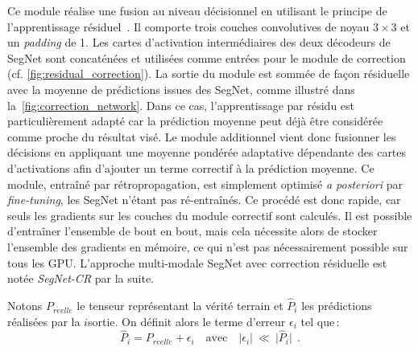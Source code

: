 Ce module réalise une fusion au niveau décisionnel en utilisant le principe de l'apprentissage résiduel~\cite{he_deep_2016}. Il comporte trois couches convolutives de noyau $3\times3$ et un \emph{padding} de \SI{1}{\px}. Les cartes d'activation intermédiaires des deux décodeurs de SegNet sont concaténées et utilisées comme entrées pour le module de correction (cf. \cref{fig:residual_correction}). La sortie du module est sommée de façon résiduelle avec la moyenne de prédictions issues des SegNet, comme illustré dans la~\cref{fig:correction_network}. Dans ce cas, l'apprentissage par résidu est particulièrement adapté car la prédiction moyenne peut déjà être considérée comme proche du résultat visé. Le module additionnel vient donc fusionner les décisions en appliquant une moyenne pondérée adaptative dépendante des cartes d'activations afin d'ajouter un terme correctif à la prédiction moyenne. Ce module, entraîné par rétropropagation, est simplement optimisé \emph{a posteriori} par \emph{fine-tuning}, les SegNet n'étant pas ré-entraînés. Ce procédé est donc rapide, car seuls les gradients sur les couches du module correctif sont calculés. Il est possible d'entraîner l'ensemble de bout en bout, mais cela nécessite alors de stocker l'ensemble des gradients en mémoire, ce qui n'est pas nécessairement possible sur tous les \gls{GPU}. L'approche multi-modale SegNet avec correction résiduelle est notée \emph{SegNet-CR} par la suite.



Notons $P_\mathit{r\acute{e}elle}$ le tenseur représentant la vérité terrain et $\hat{P}_i$ les prédictions réalisées par la $i$\ieme sortie. On définit alors le terme d'erreur $\epsilon_i$ tel que\,:
\begin{equation}
\hat{P}_i = P_\mathit{r\acute{e}elle} + \epsilon_i \text{~~~avec~~~} \lvert \epsilon_i \lvert ~\ll~ \rvert \hat{P}_i \rvert~~.
\end{equation}

